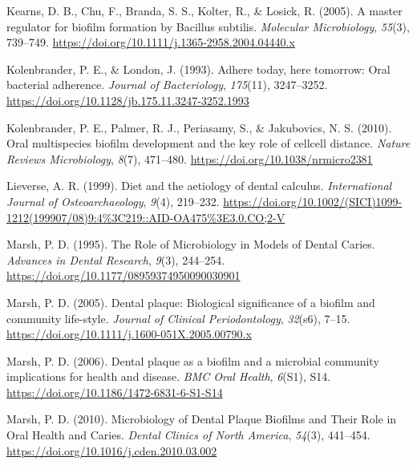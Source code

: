 \documentclass[
  b5paper,
]{book}
\newlength{\cslhangindent}
\newlength{\cslentryspacingunit} %
\newenvironment{CSLReferences}[2] %
 {%
  \setlength{\parindent}{0pt}
  \ifodd #1
  \let\oldpar\par
  \def\par{\hangindent=\cslhangindent\oldpar}
  \fi
  \setlength{\parskip}{#2\cslentryspacingunit}
 }%
 {}
\begin{document}
\begin{CSLReferences}{1}{0}
\leavevmode{}%
Kearns, D. B., Chu, F., Branda, S. S., Kolter, R., \& Losick, R. (2005).
A master regulator for biofilm formation by {Bacillus} subtilis.
\emph{Molecular Microbiology}, \emph{55}(3), 739--749.
\url{https://doi.org/10.1111/j.1365-2958.2004.04440.x}

\leavevmode{}%
Kolenbrander, P. E., \& London, J. (1993). Adhere today, here tomorrow:
Oral bacterial adherence. \emph{Journal of Bacteriology},
\emph{175}(11), 3247--3252.
\url{https://doi.org/10.1128/jb.175.11.3247-3252.1993}

\leavevmode{}%
Kolenbrander, P. E., Palmer, R. J., Periasamy, S., \& Jakubovics, N. S.
(2010). Oral multispecies biofilm development and the key role of
cell{\textendash}cell distance. \emph{Nature Reviews Microbiology},
\emph{8}(7), 471--480. \url{https://doi.org/10.1038/nrmicro2381}

\leavevmode{}%
Lieverse, A. R. (1999). Diet and the aetiology of dental calculus.
\emph{International Journal of Osteoarchaeology}, \emph{9}(4), 219--232.
\url{https://doi.org/10.1002/(SICI)1099-1212(199907/08)9:4\%3C219::AID-OA475\%3E3.0.CO;2-V}

\leavevmode{}%
Marsh, P. D. (1995). The {Role} of {Microbiology} in {Models} of {Dental
Caries}. \emph{Advances in Dental Research}, \emph{9}(3), 244--254.
\url{https://doi.org/10.1177/08959374950090030901}

\leavevmode{}%
Marsh, P. D. (2005). Dental plaque: Biological significance of a biofilm
and community life-style. \emph{Journal of Clinical Periodontology},
\emph{32}(s6), 7--15.
\url{https://doi.org/10.1111/j.1600-051X.2005.00790.x}

\leavevmode{}%
Marsh, P. D. (2006). Dental plaque as a biofilm and a microbial
community {\textendash} implications for health and disease. \emph{BMC
Oral Health}, \emph{6}(S1), S14.
\url{https://doi.org/10.1186/1472-6831-6-S1-S14}

\leavevmode{}%
Marsh, P. D. (2010). Microbiology of {Dental Plaque Biofilms} and {Their
Role} in {Oral Health} and {Caries}. \emph{Dental Clinics of North
America}, \emph{54}(3), 441--454.
\url{https://doi.org/10.1016/j.cden.2010.03.002}


\end{CSLReferences}
\end{document}
